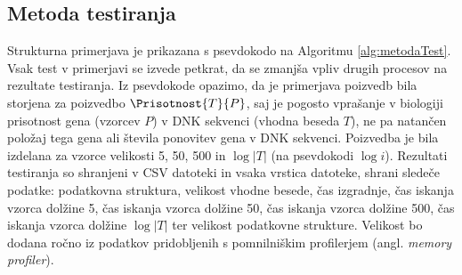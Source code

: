 \subsection{Metoda testiranja}
Strukturna primerjava je prikazana s psevdokodo na Algoritmu \ref{alg:metodaTest}. Vsak test v primerjavi se izvede petkrat, da se zmanjša vpliv drugih procesov na rezultate testiranja. Iz psevdokode opazimo, da je primerjava poizvedb  bila storjena za poizvedbo $\Prisotnost{T}{P}$, saj je pogosto vprašanje v biologiji prisotnost gena (vzorcev $P$) v DNK sekvenci (vhodna beseda $T$), ne pa natančen položaj tega gena ali števila ponovitev gena v DNK sekvenci. Poizvedba je bila izdelana za vzorce velikosti 5, 50, 500 in $\log{|T|}$ (na psevdokodi $\log{i}$). Rezultati testiranja so shranjeni v CSV datoteki in vsaka vrstica datoteke, shrani sledeče podatke: podatkovna struktura, velikost vhodne besede, čas izgradnje, čas iskanja vzorca dolžine 5, čas iskanja vzorca dolžine 50, čas iskanja vzorca dolžine 500, čas iskanja vzorca dolžine $\log{|T|}$ ter velikost podatkovne strukture. Velikost bo dodana ročno iz podatkov pridobljenih s pomnilniškim profilerjem (angl. \textit{memory profiler}). 

